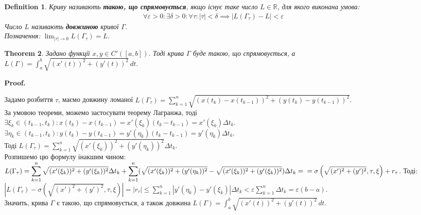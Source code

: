 \documentclass[a4paper, 10pt]{article}
\makeatletter
\def\huge{\displaystyle}
\def\qed{$\blacksquare$}
\theoremstyle{theoremdd}
\newtheorem{theorem}{Theorem}[subsection]
\theoremstyle{theoremdd}
\theoremstyle{theoremdd}
\newtheorem{definition}[theorem]{Definition}
\theoremstyle{theoremdd}
\theoremstyle{theoremdd}
\theoremstyle{theoremdd}
\theoremstyle{theoremdd}
\theoremstyle{theoremdd}
\theoremstyle{theoremdd}
\renewenvironment{proof}[1][Proof.\\]{\par
\pushQED{\hfill \qed}%
\normalfont \topsep6\p@\@plus6\p@\relax
\trivlist
\item\relax
{\bfseries
#1\@addpunct{.}}\hspace\labelsep\ignorespaces
}{%
\popQED\endtrivlist\@endpefalse
}
\makeatother
\begin{document}
\begin{definition}
Криву називають \textbf{такою, що спрямовується}, якщо існує таке число $L \in \mathbb{R}$, для якого виконана умова:
\begin{align*}
\forall \varepsilon > 0: \exists \delta > 0: \forall \tau: |\tau| < \delta \implies |L(\Gamma_\tau) -L| < \varepsilon
\end{align*}
Число $L$ називають \textbf{довжиною} кривої $\Gamma$.\\
Позначення: $\huge\lim_{|\tau| \to 0} L(\Gamma_\tau) = L$. \iffalse (знову нелегальне позначення).\fi
\end{definition}

\begin{theorem}
Задано функції $x,y \in C'([a,b])$. Тоді крива $\Gamma$ буде такою, що спрямовується, а $L(\Gamma) = \huge\int_a^b \sqrt{(x'(t))^2 + (y'(t))^2}\,dt$.
\end{theorem}

\begin{proof}
Задамо розбиття $\tau$, маємо довжину ломаної $L(\Gamma_{\tau}) = \huge\sum_{k=1}^n \sqrt{(x(t_{k})-x(t_{k-1}))^2 + (y(t_{k})-y(t_{k-1}))^2}$.\\
За умовою теореми, можемо застосувати теорему Лагранжа, тоді\\
$\exists \xi_k \in (t_{k-1},t_k): x(t_{k})-x(t_{k-1}) = x'(\xi_k) (t_{k}-t_{k-1}) = x'(\xi_k) \Delta t_k$.\\
$\exists \eta_k \in (t_{k-1},t_k): y(t_{k})-y(t_{k-1}) = y'(\eta_k) (t_k-t_{k-1}) = y'(\eta_k) \Delta t_k$.\\
Тоді $L(\Gamma_\tau) = \huge\sum_{k=1}^n \sqrt{(x'(\xi_k))^2 + (y'(\eta_k))^2} \Delta t_k$.\\
Розпишемо цю формулу інакшим чином:\\
$L(\Gamma_\tau) = \huge\sum_{k=1}^n \sqrt{(x'(\xi_k))^2 + (y'(\xi_k))^2} \Delta t_k + \huge\sum_{k=1}^n (\sqrt{(x'(\xi_k))^2 + (y'(\eta_k))^2} - \sqrt{(x'(\xi_k))^2 + (y'(\xi_k))^2}) \Delta t_k = \\ = \sigma \left(\sqrt{(x')^2+(y')^2}, \tau, \xi \right) + r_\tau$. Тоді:\\
$|L(\Gamma_\tau) - \sigma \left(\sqrt{(x')^2+(y')^2}, \tau, \xi \right)| = |r_\tau| \leq \huge\sum_{k=1}^n |y'(\eta_k) - y'(\xi_k)| \Delta t_k < \varepsilon \huge\sum_{k=1}^n \Delta t_k = \varepsilon (b-a)$.\\
Значить, крива $\Gamma$ є такою, що спрямовується, а також довжина
$L(\Gamma) = \huge\int_a^b \sqrt{(x'(t))^2 + (y'(t))^2}\,dt$.
\end{proof}
\end{document}
